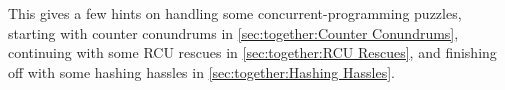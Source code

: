 
%


This 
gives a few hints on handling some concurrent-programming
puzzles, starting with counter conundrums in
\cref{sec:together:Counter Conundrums},
continuing with some RCU rescues in
\cref{sec:together:RCU Rescues},
and finishing off with some hashing hassles in
\cref{sec:together:Hashing Hassles}.






